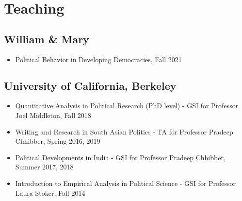\documentclass[11pt]{article}
\begin{document}
\vspace{2mm}


\vspace{2mm}
\color{MidnightBlue}

\section*{Teaching}
\color{Black}
\subsection*{William \& Mary}
\begin{itemize}[nosep]
	\item[]Political Behavior in Developing Democracies, Fall 2021
\end{itemize}
\subsection*{University of California, Berkeley}

\begin{itemize}[nosep]
	\item[]Quantitative Analysis in Political Research (PhD level) - GSI for Professor Joel Middleton, Fall 2018 
		\item[]Writing and Research in South Asian Politics - TA for Professor Pradeep Chhibber, Spring 2016, 2019
	\item[] Political Developments in India - GSI for Professor Pradeep Chhibber, Summer 2017, 2018
	\item[]Introduction to Empirical Analysis in Political Science - GSI for Professor Laura Stoker, Fall 2014	
\end{itemize}

\vspace{2mm}

\color{MidnightBlue}
\end{document}
